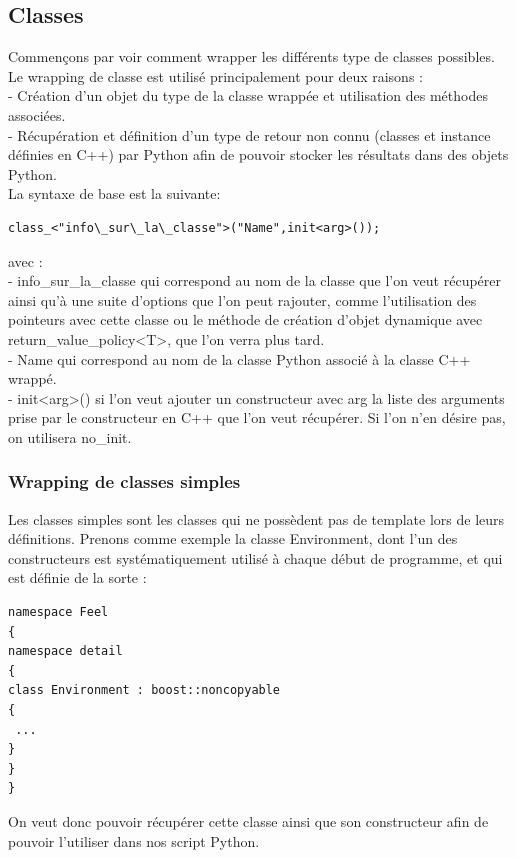 \documentclass[french,12pt]{article}
\begin{document}
\subsection{Classes}
Commençons par voir comment wrapper les différents type de classes possibles.
Le wrapping de classe est utilisé principalement pour deux raisons : \\
- Création d'un objet du type de la classe wrappée et utilisation des méthodes associées. \\
- Récupération et définition d'un type de retour non connu (classes et instance définies en C++) par Python afin de pouvoir stocker les résultats dans des objets Python. \\

La syntaxe de base est la suivante:
\begin{lstlisting}
class_<"info\_sur\_la\_classe">("Name",init<arg>());
\end{lstlisting}
avec :\\
- info\_sur\_la\_classe qui correspond au nom de la classe que l'on veut récupérer ainsi qu'à une suite d'options que l'on peut rajouter, comme l'utilisation des pointeurs avec cette classe ou le méthode de création d'objet dynamique avec return\_value\_policy<T>, que l'on verra plus tard.\\
- Name qui correspond au nom de la classe Python associé à la classe C++ wrappé.\\
- init<arg>() si l'on veut ajouter un constructeur avec arg la liste des arguments prise par le constructeur en C++ que l'on veut récupérer. Si l'on n'en désire pas, on utilisera no\_init.\\

\subsubsection{Wrapping de classes simples}
Les classes simples sont les classes qui ne possèdent pas de template lors de leurs définitions. Prenons comme exemple la classe Environment, dont l'un des constructeurs est systématiquement utilisé à chaque début de programme, et qui est définie de la sorte :
\begin{lstlisting}
namespace Feel 
{
namespace detail
{
class Environment : boost::noncopyable
{
 ...
}
}
}
\end{lstlisting}
On veut donc pouvoir récupérer cette classe ainsi que son constructeur afin de pouvoir l'utiliser dans nos script Python. 
\newline
\end{document}
